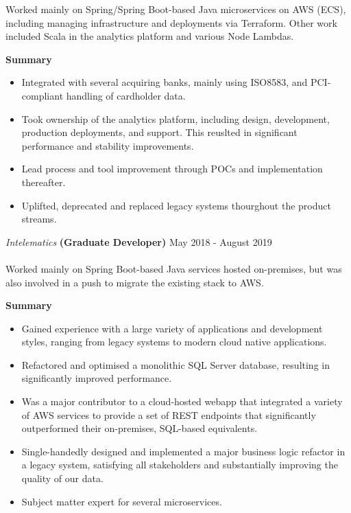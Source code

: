 \documentclass[margin, 11pt]{style}
\begin{document}
\begin{resume}
Worked mainly on Spring/Spring Boot-based Java microservices on AWS (ECS), including managing infrastructure and deployments via Terraform. Other work included Scala in the analytics platform and various Node Lambdas.

\textbf{Summary}

\begin{itemize}
\item Integrated with several acquiring banks, mainly using ISO8583, and PCI-compliant handling of cardholder data.
\item Took ownership of the analytics platform, including design, development, production deployments, and support. This reuslted in significant performance and stability improvements.
\item Lead process and tool improvement through POCs and implementation thereafter.
\item Uplifted, deprecated and replaced legacy systems thourghout the product streams.

\end{itemize}


{\sl Intelematics} \textbf{(Graduate Developer)} \hfill May 2018 - August 2019 \\
\vspace{15pt}\\

Worked mainly on Spring Boot-based Java services hosted on-premises, but was also involved in a push to migrate the existing stack to AWS.

\textbf{Summary}
\begin{itemize}
\item Gained experience with a large variety of applications and development styles, ranging from legacy systems to modern cloud native applications.
\item Refactored and optimised a monolithic SQL Server database, resulting in significantly improved performance.
\item Was a major contributor to a cloud-hosted webapp that integrated a variety of AWS services to provide a set of REST endpoints that significantly outperformed their on-premises, SQL-based equivalents.
\item Single-handedly designed and implemented a major business logic refactor in a legacy system, satisfying all stakeholders and substantially improving the quality of our data.
\item Subject matter expert for several microservices.



\end{itemize}
\end{resume}
\end{document}
